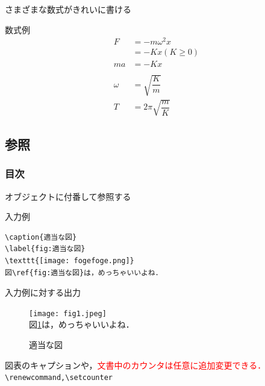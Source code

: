 \documentclass[dvipdfmx]{beamer}
\begin{document}
\begin{frame}{さまざまな数式がきれいに書ける}
    \begin{exampleblock}{数式例}
        \begin{align*}
            F      & = -m\omega^2x\tag{復元力}                               \\
                   & = -Kx (K\geq 0)                                         \\
            ma     & = -Kx                                                   \\\\
            \omega & =\sqrt{\dfrac{K}{m}}                                    \\
            T      & = 2\pi\sqrt{\dfrac{m}{K}}\tag{復元力による単振動の周期}
        \end{align*}
    \end{exampleblock}
\end{frame}

\subsection{参照}
\begin{frame}
    \frametitle{目次}
    \tableofcontents[currentsection,sectionstyle=show/shaded,subsectionstyle=show/shaded]
\end{frame}

\begin{frame}[fragile]{オブジェクトに付番して参照する}
    \begin{exampleblock}{入力例}
        \begin{verbatim}
\caption{適当な図}
\label{fig:適当な図}
\texttt{[image: fogefoge.png]}
図\ref{fig:適当な図}は，めっちゃいいよね．
    \end{verbatim}
    \end{exampleblock}
    \begin{exampleblock}{入力例に対する出力}
        \begin{figure}[h]
            \centering
            \caption{適当な図}
            \label{fig:適当な図}
            \texttt{[image: fig1.jpeg]}\\
            図\ref{fig:適当な図}は，めっちゃいいよね．
        \end{figure}
    \end{exampleblock}
    図表のキャプションや，\textcolor{red}{文書中のカウンタは任意に追加変更できる．}\verb|\renewcommand,\setcounter|
\end{frame}
\end{document}
